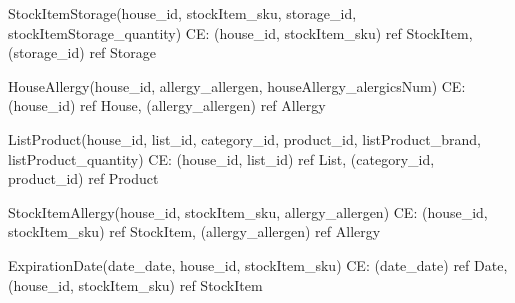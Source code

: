 {\begin{description}
		\item StockItemStorage(house\_id, stockItem\_sku, storage\_id, stockItemStorage\_quantity) \newline
		CE: {(house\_id, stockItem\_sku) ref StockItem, (storage\_id) ref Storage}
		
		\item HouseAllergy(house\_id, allergy\_allergen, houseAllergy\_alergicsNum) \newline
		CE: {(house\_id) ref House, (allergy\_allergen) ref Allergy}
		
		\item ListProduct(house\_id, list\_id, category\_id, product\_id, listProduct\_brand, listProduct\_quantity) \newline
		CE: {(house\_id, list\_id) ref List, (category\_id, product\_id) ref Product}
		
		\item StockItemAllergy(house\_id, stockItem\_sku, allergy\_allergen) \newline
		CE: {(house\_id, stockItem\_sku) ref StockItem, (allergy\_allergen) ref Allergy}
		
		
		
		\item ExpirationDate(date\_date, house\_id, stockItem\_sku) \newline
		CE: {(date\_date) ref Date, (house\_id, stockItem\_sku) ref StockItem}
	\end{description}	
}














	
	
	
	
	




	
	


